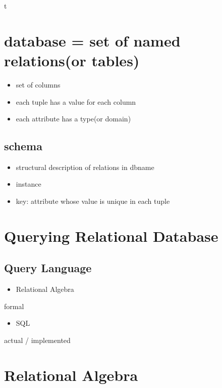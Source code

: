 \documentclass[11pt]{article}
\author{weiwu}
\date{\today}
\title{}
\begin{document}
\setcounter{tocdepth}{2}
\tableofcontents

t

\section{database = set of named relations(or tables)}
\label{sec:orgheadline2}
\begin{itemize}
\item set of columns
\item each tuple has a value for each column
\item each attribute has a type(or domain)
\end{itemize}
\subsection{schema}
\label{sec:orgheadline1}
\begin{itemize}
\item structural description of relations in dbname
\item instance
\item key: attribute whose value is unique in each tuple
\end{itemize}
\section{Querying Relational Database}
\label{sec:orgheadline4}
\subsection{Query Language}
\label{sec:orgheadline3}
\begin{itemize}
\item Relational Algebra
\end{itemize}
formal
\begin{itemize}
\item SQL
\end{itemize}
actual / implemented
\section{Relational Algebra}
\label{sec:orgheadline12}
\end{document}
